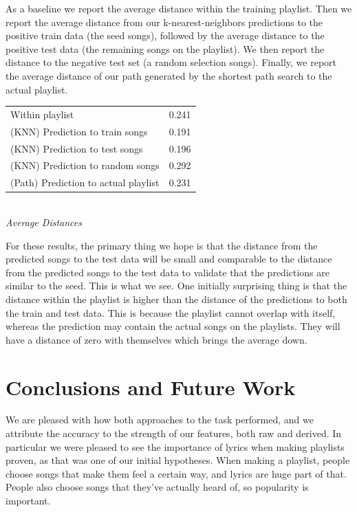 \documentclass[acmtog]{acmart}
\begin{document}
As a baseline we report the average distance within the training playlist. Then we report the average distance from our k-nearest-neighbors predictions to the positive train data (the seed songs), followed by the average distance to the positive test data (the remaining songs on the playlist). We then report the distance to the negative test set (a random selection songs). Finally, we report the average distance of our path generated by the shortest path search to the actual playlist. \\

\begin{center}
\begin{tabular}{ll}
  \toprule
  Within playlist                      & 0.241 \\
  (KNN) Prediction to train songs      & 0.191 \\
  (KNN) Prediction to test songs       & 0.196 \\
  (KNN) Prediction to random songs     & 0.292 \\
  (Path) Prediction to actual playlist & 0.231 \\
  \bottomrule
\end{tabular}
\\
\footnotesize
  \emph{Average Distances}
\end{center}

For these results, the primary thing we hope is that the distance from the predicted songs to the test data will be small and comparable to the distance from the predicted songs to the test data to validate that the predictions are similar to the seed. This is what we see. One initially surprising thing is that the distance within the playlist is higher than the distance of the predictions to both the train and test data. This is because the playlist cannot overlap with itself, whereas the prediction may contain the actual songs on the playlists. They will have a distance of zero with themselves which brings the average down.

\section{Conclusions and Future Work}

We are pleased with how both approaches to the task performed, and we attribute the accuracy to the strength of our features, both raw and derived. In particular we were pleased to see the importance of lyrics when making playlists proven, as that was one of our initial hypotheses. When making a playlist, people choose songs that make them feel a certain way, and lyrics are huge part of that. People also choose songs that they've actually heard of, so popularity is important.
\end{document}
